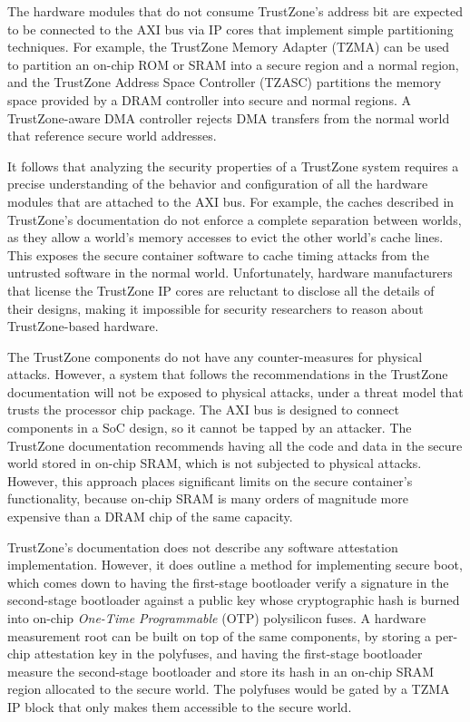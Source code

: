 The hardware modules that do not consume TrustZone's address bit are expected
to be connected to the AXI bus via IP cores that implement simple
partitioning techniques. For example, the TrustZone Memory Adapter (TZMA) can
be used to partition an on-chip ROM or SRAM into a secure region and a normal
region, and the TrustZone Address Space Controller (TZASC) partitions the
memory space provided by a DRAM controller into secure and normal regions. A
TrustZone-aware DMA controller rejects DMA transfers from the normal world that
reference secure world addresses.

It follows that analyzing the security properties of a TrustZone system
requires a precise understanding of the behavior and configuration of all the
hardware modules that are attached to the AXI bus. For example, the caches
described in TrustZone's documentation do not enforce a complete separation
between worlds, as they allow a world's memory accesses to evict the other
world's cache lines. This exposes the secure container software to cache timing
attacks from the untrusted software in the normal world. Unfortunately,
hardware manufacturers that license the TrustZone IP cores are reluctant to
disclose all the details of their designs, making it impossible for security
researchers to reason about TrustZone-based hardware.

The TrustZone components do not have any counter-measures for physical attacks.
However, a system that follows the recommendations in the TrustZone
documentation will not be exposed to physical attacks, under a threat model
that trusts the processor chip package. The AXI bus is designed to connect
components in a SoC design, so it cannot be tapped by an attacker. The
TrustZone documentation recommends having all the code and data in the secure
world stored in on-chip SRAM, which is not subjected to physical attacks.
However, this approach places significant limits on the secure container's
functionality, because on-chip SRAM is many orders of magnitude more expensive
than a DRAM chip of the same capacity.

TrustZone's documentation does not describe any software attestation
implementation. However, it does outline a method for implementing secure boot,
which comes down to having the first-stage bootloader verify a signature in the
second-stage bootloader against a public key whose cryptographic hash is burned
into on-chip \textit{One-Time Programmable} (OTP) polysilicon fuses. A hardware
measurement root can be built on top of the same components, by storing a
per-chip attestation key in the polyfuses, and having the first-stage
bootloader measure the second-stage bootloader and store its hash in an on-chip
SRAM region allocated to the secure world. The polyfuses would be gated by a
TZMA IP block that only makes them accessible to the secure world.
